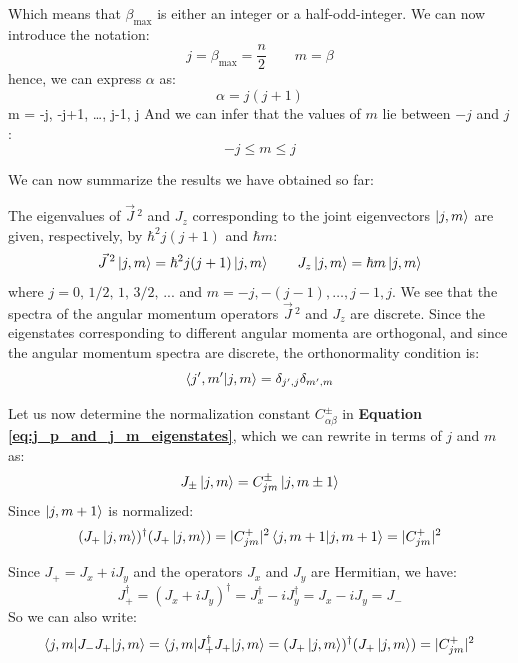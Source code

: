 Which means that $\beta_\text{max}$ is either an integer or a half-odd-integer. We can now introduce the notation:
\begin{equation}
    j = \beta_\text{max} = \frac{n}{2}\qquad m = \beta
\end{equation}
hence, we can express $\alpha$ as:
\begin{equation}
    \alpha = j(j+1)
\end{equation}m = -j, -j+1, \dots, j-1, j
And we can infer that the values of $m$ lie between $-j$ and $j$:
\begin{equation}
    -j \leq m \leq j
\end{equation}

We can now summarize the results we have obtained so far:
\begin{definition}
    The eigenvalues of $\vec{J}\,^2$ and $J_z$ corresponding to the joint eigenvectors $\ket{j,m}$ are given, respectively, by $\hbar^2j(j+1)$ and $\hbar m$:
    \begin{equation}
        \vec{J}\,^2\ket{j,m} = \hbar^2j(j+1)\ket{j,m}\qquad J_z\ket{j,m} = \hbar m\ket{j,m}
    \end{equation}
    where $j = 0,\, 1/2,\, 1,\, 3/2,\, ...$ and $m = -j, -(j-1), \dots, j-1, j$. We see that the spectra of the angular momentum operators $\vec{J}\,^2$ and $J_z$ are discrete. Since the eigenstates corresponding to different angular momenta are orthogonal, and since the angular momentum spectra are discrete, the orthonormality condition is:
    \begin{equation}
        \braket{j',m'|j,m} = \delta_{j',j}\delta_{m',m}
    \end{equation}
\end{definition}

Let us now determine the normalization constant $C_{\alpha\beta}^\pm$ in \textbf{Equation \ref{eq:j_p_and_j_m_eigenstates}}, which we can rewrite in terms of $j$ and $m$ as:
\begin{equation}
    J_\pm\ket{j,m} = C_{jm}^\pm\ket{j,m\pm 1}
\end{equation}
Since $\ket{j,m+1}$ is normalized:
\begin{equation}
    (J_+\ket{j,m})^\dagger (J_+\ket{j,m}) = |C_{jm}^+|^2\braket{j, m+1|j, m+1} = |C_{jm}^+|^2
\end{equation}

Since $J_+ = J_x + iJ_y$ and the operators $J_x$ and $J_y$ are Hermitian, we have:
\begin{equation}
    J_+^\dagger = (J_x+iJ_y)^\dagger = J_x^\dagger -iJ_y^\dagger = J_x - iJ_y = J_-
\end{equation}
So we can also write:
\begin{equation}
    \braket{j,m|J_-J_+|j,m} = \braket{j,m|J_+^\dagger J_+|j,m} = (J_+\ket{j,m})^\dagger (J_+\ket{j,m}) = |C_{jm}^+|^2
\end{equation}

